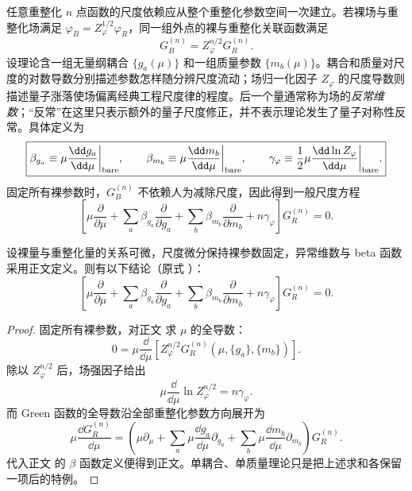 任意重整化 $n$ 点函数的尺度依赖应从整个重整化参数空间一次建立。若裸场与重整化场满足 $\varphi_B=Z_\varphi^{1/2}\varphi_R$，同一组外点的裸与重整化关联函数满足
\begin{equation}
 \boxed{
 G_B^{(n)}=Z_\varphi^{n/2}G_R^{(n)}.}
 \label{eq:bare-ren-green-relation-r68}
\end{equation}
设理论含一组无量纲耦合 $\{g_a(\mu)\}$ 和一组质量参数 $\{m_b(\mu)\}$。耦合和质量对尺度的对数导数分别描述参数怎样随分辨尺度流动；场归一化因子 $Z_\varphi$ 的尺度导数则描述量子涨落使场偏离经典工程尺度律的程度。后一个量通常称为场的\emph{反常维数}；“反常”在这里只表示额外的量子尺度修正，并不表示理论发生了量子对称性反常。具体定义为
\begin{equation}
\boxed{
 \beta_{g_a}\equiv\mu\frac{\dd g_a}{\dd\mu}\bigg|_{\rm bare},
 \qquad
 \beta_{m_b}\equiv\mu\frac{\dd m_b}{\dd\mu}\bigg|_{\rm bare},
 \qquad
 \gamma_\varphi\equiv\frac12\mu\frac{\dd\ln Z_\varphi}{\dd\mu}\bigg|_{\rm bare}.}
\label{eq:rg-general-flow-definitions-dp74}
\end{equation}
固定所有裸参数时，$G_B^{(n)}$ 不依赖人为减除尺度，因此得到一般尺度方程
\begin{equation}
 \boxed{
 \left[
 \mu\frac{\partial}{\partial\mu}
 +\sum_a\beta_{g_a}\frac{\partial}{\partial g_a}
 +\sum_b\beta_{m_b}\frac{\partial}{\partial m_b}
 +n\gamma_\varphi
 \right]G_R^{(n)}=0.}
 \label{eq:callan-symanzik-general-dp10}
\end{equation}

\begin{proposition}[尺度不变裸量的微分方程]
设裸量与重整化量的关系可微，尺度微分保持裸参数固定，异常维数与 beta 函数采用正文定义。则有以下结论（原式 ）：
\begin{equation*}
 \boxed{
 \left[
 \mu\frac{\partial}{\partial\mu}
 +\sum_a\beta_{g_a}\frac{\partial}{\partial g_a}
 +\sum_b\beta_{m_b}\frac{\partial}{\partial m_b}
 +n\gamma_\varphi
 \right]G_R^{(n)}=0.}
\end{equation*}
\end{proposition}
\begin{proof}
固定所有裸参数，对正文 求 $\mu$ 的全导数：
\begin{equation*}
 0=\mu\frac{\dd}{\dd\mu}
 \left[Z_\varphi^{n/2}G_R^{(n)}(\mu,\{g_a\},\{m_b\})\right].
\end{equation*}
除以 $Z_\varphi^{n/2}$ 后，场强因子给出
\begin{equation*}
 \mu\frac{\dd}{\dd\mu}\ln Z_\varphi^{n/2}
 =n\gamma_\varphi.
\end{equation*}
而 Green 函数的全导数沿全部重整化参数方向展开为
\begin{equation*}
 \mu\frac{\dd G_R^{(n)}}{\dd\mu}
 =\left(
 \mu\partial_\mu
 +\sum_a\mu\frac{\dd g_a}{\dd\mu}\partial_{g_a}
 +\sum_b\mu\frac{\dd m_b}{\dd\mu}\partial_{m_b}
 \right)G_R^{(n)}.
\end{equation*}
代入正文 的 $\beta$ 函数定义便得到正文。单耦合、单质量理论只是把上述求和各保留一项后的特例。
\end{proof}

